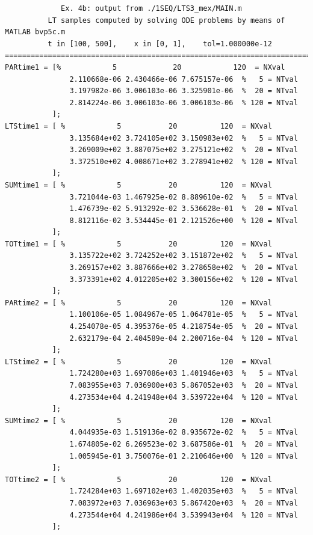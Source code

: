 \documentclass[a4paper,10pt]{report}%
\begin{document}
\begin{lstlisting}
             Ex. 4b: output from ./1SEQ/LTS3_mex/MAIN.m
          LT samples computed by solving ODE problems by means of MATLAB bvp5c.m
          t in [100, 500],    x in [0, 1],    tol=1.000000e-12
====================================================================================
PARtime1 = [%            5             20            120  = NXval
               2.110668e-06 2.430466e-06 7.675157e-06  %   5 = NTval
               3.197982e-06 3.006103e-06 3.325901e-06  %  20 = NTval
               2.814224e-06 3.006103e-06 3.006103e-06  % 120 = NTval
           ];
LTStime1 = [ %            5           20          120  = NXval
               3.135684e+02 3.724105e+02 3.150983e+02  %   5 = NTval
               3.269009e+02 3.887075e+02 3.275121e+02  %  20 = NTval
               3.372510e+02 4.008671e+02 3.278941e+02  % 120 = NTval
           ];
SUMtime1 = [ %            5           20          120  = NXval
               3.721044e-03 1.467925e-02 8.889610e-02  %   5 = NTval
               1.476739e-02 5.913292e-02 3.536628e-01  %  20 = NTval
               8.812116e-02 3.534445e-01 2.121526e+00  % 120 = NTval
           ];
TOTtime1 = [ %            5           20          120  = NXval
               3.135722e+02 3.724252e+02 3.151872e+02  %   5 = NTval
               3.269157e+02 3.887666e+02 3.278658e+02  %  20 = NTval
               3.373391e+02 4.012205e+02 3.300156e+02  % 120 = NTval
           ];
PARtime2 = [ %            5           20          120  = NXval
               1.100106e-05 1.084967e-05 1.064781e-05  %   5 = NTval
               4.254078e-05 4.395376e-05 4.218754e-05  %  20 = NTval
               2.632179e-04 2.404589e-04 2.200716e-04  % 120 = NTval
           ];
LTStime2 = [ %            5           20          120  = NXval
               1.724280e+03 1.697086e+03 1.401946e+03  %   5 = NTval
               7.083955e+03 7.036900e+03 5.867052e+03  %  20 = NTval
               4.273534e+04 4.241948e+04 3.539722e+04  % 120 = NTval
           ];
SUMtime2 = [ %            5           20          120  = NXval
               4.044935e-03 1.519136e-02 8.935672e-02  %   5 = NTval
               1.674805e-02 6.269523e-02 3.687586e-01  %  20 = NTval
               1.005945e-01 3.750076e-01 2.210646e+00  % 120 = NTval
           ];
TOTtime2 = [ %            5           20          120  = NXval
               1.724284e+03 1.697102e+03 1.402035e+03  %   5 = NTval
               7.083972e+03 7.036963e+03 5.867420e+03  %  20 = NTval
               4.273544e+04 4.241986e+04 3.539943e+04  % 120 = NTval
           ];
\end{lstlisting}
\end{document}
